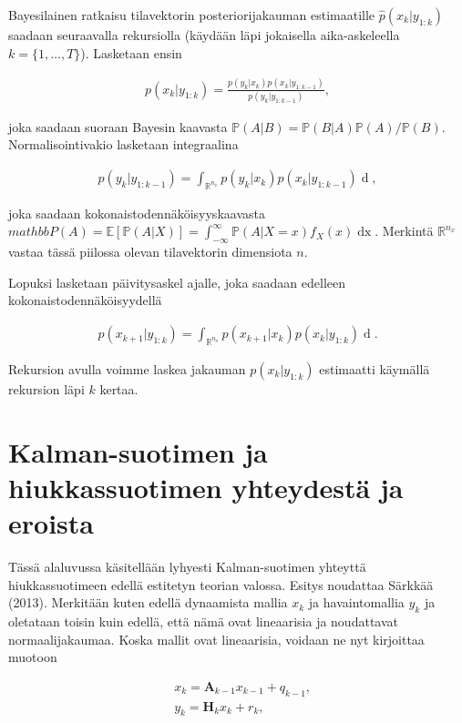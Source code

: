 \documentclass[
  12pt,
  a4paper, twoside]{book}
\begin{document}
Bayesilainen ratkaisu tilavektorin posteriorijakauman estimaatille \(\hat{p}(x_k|y_{1:k})\) saadaan seuraavalla rekursiolla (käydään läpi jokaisella aika-askeleella \(k=\{1,\ldots,T\}\)). Lasketaan ensin

\begin{align}\label{bayes-paivitys}
p(x_k|y_{1:k}) = \frac{p(y_k|x_k)p(x_k|y_{1:k-1})}{p(y_k|y_{1:k-1})},
\end{align}

\noindent joka saadaan suoraan Bayesin kaavasta \(\mathbb{P}(A|B)=\mathbb{P}(B|A)\mathbb{P}(A)/\mathbb{P}(B)\). Normalisointivakio lasketaan integraalina

\begin{align}\label{bayes-normalisointi}
p(y_k|y_{1:k-1})=\int_{\mathbb{R}^{n_x}}p(y_k|x_k)p(x_k|y_{1:k-1})\mathop{dx_k},
\end{align}

\noindent joka saadaan kokonaistodennäköisyyskaavasta \(mathbb{P}(A)=\mathbb{E}[\mathbb{P}(A|X)]=\int_{-\infty}^{\infty}\mathbb{P}(A|X=x)f_X(x)\mathop{dx}\). Merkintä \(\mathbb{R}^{n_x}\) vastaa tässä piilossa olevan tilavektorin dimensiota \(n\).

Lopuksi lasketaan päivitysaskel ajalle, joka saadaan edelleen kokonaistodennäköisyydellä

\begin{align}\label{bayes-aikapaivitys}
p(x_{k+1}|y_{1:k})=\int_{\mathbb{R}^{n_x}}p(x_{k+1}|x_k)p(x_k|y_{1:k})\mathop{dx_k}.
\end{align}

\noindent Rekursion avulla voimme laskea jakauman \(p(x_k|y_{1:k})\) estimaatti käymällä rekursion läpi \(k\) kertaa.

\section{Kalman-suotimen ja hiukkassuotimen yhteydestä ja eroista} \label{kf-yhteydet-erot}

Tässä alaluvussa käsitellään lyhyesti Kalman-suotimen yhteyttä hiukkassuotimeen edellä estitetyn teorian valossa. Esitys noudattaa Särkkää (2013). \citep{sarkka-2013} Merkitään kuten edellä dynaamista mallia \(x_k\) ja havaintomallia \(y_k\) ja oletataan toisin kuin edellä, että nämä ovat lineaarisia ja noudattavat normaalijakaumaa. Koska mallit ovat lineaarisia, voidaan ne nyt kirjoittaa muotoon

\begin{align}
&\label{kalman-malli1}x_k=\mathbf{A}_{k-1}x_{k-1}+q_{k-1},\\
&\label{kalman-malli2}y_k=\mathbf{H}_k x_k + r_k,
\end{align}
\end{document}
